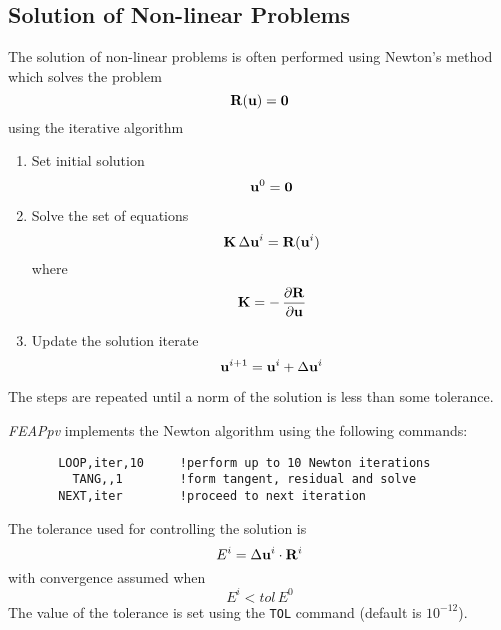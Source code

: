 \subsection{Solution of Non-linear Problems}
\label{nonlin}

The solution of non-linear problems is often performed using Newton's
method which solves the problem
\begin{equation}
\mathbf{R}(\mathbf{u}) = \mathbf{0}
\end{equation}
using the iterative algorithm

\begin{enumerate}
\item Set initial solution
\begin{equation}
\mathbf{u}^0 = \mathbf{0}
\end{equation}
\item Solve the set of equations
\begin{equation}
\mathbf{K} \, \Delta\mathbf{u}^i = \mathbf{R}(\mathbf{u}^i)
\end{equation}
where
\begin{equation}
\mathbf{K} = - \, \frac{\partial \mathbf{R}}{\partial \mathbf{u}}
\end{equation}
\item
Update the solution iterate
\begin{equation}
\mathbf{u}^{i+1} = \mathbf{u}^i + \Delta\mathbf{u}^i
\end{equation}
\end{enumerate}
The steps are repeated until a norm of the solution is less than some tolerance.

{\sl FEAPpv} implements the Newton algorithm using the
following commands:
\begin{verbatim}
       LOOP,iter,10     !perform up to 10 Newton iterations
         TANG,,1        !form tangent, residual and solve
       NEXT,iter        !proceed to next iteration
\end{verbatim}
The tolerance used for controlling the solution is
\begin{equation}
E^i = \Delta{\mathbf{u}^i} \cdot \mathbf{R}^i
\end{equation}
with convergence assumed when
\begin{equation}
E^i < tol \, E^0
\end{equation}
The value of the tolerance is set using the {\tt TOL} command (default
is $10^{-12}$).

